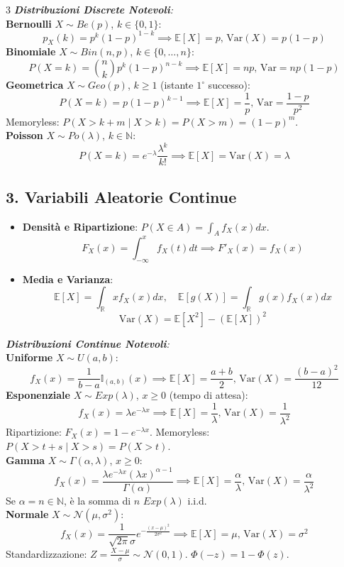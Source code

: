 \documentclass[9pt,a4paper]{article}
\begin{document}
\begin{multicols*}{3}
\textit{\textbf{Distribuzioni Discrete Notevoli}:} \\
\textbf{Bernoulli} $X \sim Be(p)$, $k \in \{0, 1\}$:
\[ p_X(k) = p^k(1-p)^{1-k} \implies \mathbb{E}[X]=p, \, \text{Var}(X)=p(1-p) \]
\textbf{Binomiale} $X \sim Bin(n, p)$, $k \in \{0, \dots, n\}$:
\[ P(X = k) = \binom{n}{k} p^k (1-p)^{n-k} \implies \mathbb{E}[X]=np, \, \text{Var}=np(1-p) \]
\textbf{Geometrica} $X \sim Geo(p)$, $k \ge 1$ (istante $1^\circ$ successo):
\[ P(X = k) = p(1-p)^{k-1} \implies \mathbb{E}[X]=\frac{1}{p}, \, \text{Var}=\frac{1-p}{p^2} \]
Memoryless: $P(X > k+m \mid X > k) = P(X > m) = (1-p)^m$. \\
\textbf{Poisson} $X \sim Po(\lambda)$, $k \in \mathbb{N}$:
\[ P(X = k) = e^{-\lambda} \frac{\lambda^k}{k!} \implies \mathbb{E}[X] = \text{Var}(X) = \lambda \]

{\color{navy}\subsection*{3. Variabili Aleatorie Continue}}
\begin{itemize}
    \item \textbf{Densità e Ripartizione}: $P(X \in A) = \int_A f_X(x)dx$.
    \[ F_X(x) = \int_{-\infty}^{x} f_X(t)dt \implies F'_X(x) = f_X(x) \]
    \item \textbf{Media e Varianza}:
    \[ \mathbb{E}[X] = \int_{\mathbb{R}} x f_X(x)dx, \quad \mathbb{E}[g(X)] = \int_{\mathbb{R}} g(x) f_X(x)dx \]
    \[ \text{Var}(X) = \mathbb{E}[X^2] - (\mathbb{E}[X])^2 \]
\end{itemize}

\textit{\textbf{Distribuzioni Continue Notevoli}:} \\
\textbf{Uniforme} $X \sim U(a, b)$:
\[ f_X(x) = \frac{1}{b-a} \mathbb{I}_{(a,b)}(x) \implies \mathbb{E}[X] = \frac{a+b}{2}, \, \text{Var}(X) = \frac{(b-a)^2}{12} \]
\textbf{Esponenziale} $X \sim Exp(\lambda)$, $x \ge 0$ (tempo di attesa):
\[ f_X(x) = \lambda e^{-\lambda x} \implies \mathbb{E}[X] = \frac{1}{\lambda}, \, \text{Var}(X) = \frac{1}{\lambda^2} \]
Ripartizione: $F_X(x) = 1 - e^{-\lambda x}$. Memoryless: $P(X > t+s \mid X > s) = P(X > t)$. \\
\textbf{Gamma} $X \sim \Gamma(\alpha, \lambda)$, $x \ge 0$:
\[ f_X(x) = \frac{\lambda e^{-\lambda x} (\lambda x)^{\alpha-1}}{\Gamma(\alpha)} \implies \mathbb{E}[X]=\frac{\alpha}{\lambda}, \, \text{Var}(X)=\frac{\alpha}{\lambda^2} \]
Se $\alpha = n \in \mathbb{N}$, è la somma di $n$ $Exp(\lambda)$ i.i.d. \\
\textbf{Normale} $X \sim \mathcal{N}(\mu, \sigma^2)$:
\[ f_X(x) = \frac{1}{\sqrt{2\pi}\sigma} e^{-\frac{(x-\mu)^2}{2\sigma^2}} \implies \mathbb{E}[X] = \mu, \, \text{Var}(X) = \sigma^2 \]
Standardizzazione: $Z = \frac{X-\mu}{\sigma} \sim \mathcal{N}(0, 1)$. $\Phi(-z) = 1 - \Phi(z)$.


\end{multicols*}
\end{document}
